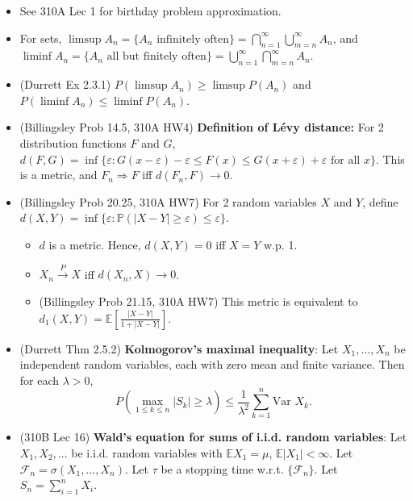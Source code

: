 \documentclass[twoside]{article}
\newcommand{\dis}{\displaystyle}
\newcommand\bbE{\mathbb{E}}
\newcommand\bbP{\mathbb{P}}
\newcommand\calF{\mathcal{F}}
\def\eps{\varepsilon}
\newcommand\lmb{\lambda}
\newcommand\sg{\sigma}
\newcommand\goesto{\rightarrow}
\newcommand\var{\text{Var }}
\begin{document}
\begin{itemize}
\item See 310A Lec 1 for birthday problem approximation.

\item For sets, $\limsup A_n = \{ A_n \text{ infinitely often}\} = \displaystyle\bigcap_{n=1}^\infty\bigcup_{m=n}^\infty A_n$, and $\liminf A_n = \{ A_n \text{ all but finitely often}\} = \displaystyle\bigcup_{n=1}^\infty\bigcap_{m=n}^\infty A_n$.

\item (Durrett Ex 2.3.1) $P(\limsup A_n) \geq \limsup P(A_n)$ and $P(\liminf A_n) \leq \liminf P(A_n)$.

\item (Billingsley Prob 14.5, 310A HW4) \textbf{Definition of L\'{e}vy distance:} For 2 distribution functions $F$ and $G$, $d(F, G) = \inf \{ \eps: G(x-\eps) - \eps \leq F(x) \leq G(x+\eps) + \eps \text{ for all } x \}$. This is a metric, and $F_n \Rightarrow F$ iff $d(F_n, F) \goesto 0$.

\item (Billingsley Prob 20.25, 310A HW7) For 2 random variables $X$ and $Y$, define $d(X, Y) = \inf \{\eps: \bbP (|X-Y| \geq \eps) \leq \eps\}$.
\begin{itemize}
\item $d$ is a metric. Hence, $d(X,Y) = 0$ iff $X=Y$ w.p. 1.
\item $X_n \stackrel{P}{\goesto} X$ iff $d(X_n, X) \goesto 0$.
\item (Billingsley Prob 21.15, 310A HW7) This metric is equivalent to $d_1(X,Y) = \bbE \left[ \dis\frac{|X-Y|}{1+|X-Y|} \right]$.
\end{itemize}



\item (Durrett Thm 2.5.2) \textbf{Kolmogorov's maximal inequality}: Let $X_1, \dots, X_n$ be independent random variables, each with zero mean and finite variance. Then for each $\lmb > 0$,
\begin{equation*}
P \left( \max_{1 \leq k \leq n} |S_k| \geq \lmb \right) \leq \frac{1}{\lmb^2} \sum_{k=1}^n \var X_k.
\end{equation*}

\item (310B Lec 16) \textbf{Wald's equation for sums of i.i.d. random variables}: Let $X_1, X_2, \dots$ be i.i.d. random variables with $\bbE X_1 = \mu$, $\bbE |X_1| < \infty$. Let $\calF_n = \sg(X_1, \dots, X_n)$. Let $\tau$ be a stopping time w.r.t. $\{ \calF_n \}$. Let $S_n = \dis\sum_{i=1}^n X_i$.


\end{itemize}
\end{document}
